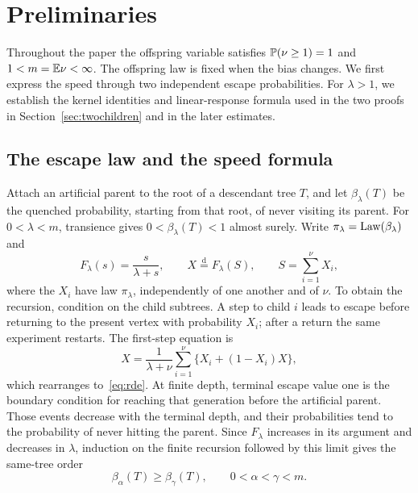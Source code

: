 \section{Preliminaries}\label{sec:preliminaries}

Throughout the paper the offspring variable satisfies $\mathbb P(\nu\ge1)=1$ and $1<m=\mathbb E\nu<\infty$. The offspring law is fixed when the bias changes. We first express the speed through two independent escape probabilities. For $\lambda>1$, we establish the kernel identities and linear-response formula used in the two proofs in Section~\ref{sec:twochildren} and in the later estimates.

\subsection{The escape law and the speed formula}
Attach an artificial parent to the root of a descendant tree $T$, and let $\beta_\lambda(T)$ be the quenched probability, starting from that root, of never visiting its parent. For $0<\lambda<m$, transience gives $0<\beta_\lambda(T)<1$ almost surely. Write $\pi_\lambda=\operatorname{Law}(\beta_\lambda)$ and
\begin{equation}\label{eq:rde}
 F_\lambda(s)=\frac{s}{\lambda+s},\qquad
 X\overset{\mathrm d}=F_\lambda(S),\qquad S=\sum_{i=1}^{\nu}X_i,
\end{equation}
where the $X_i$ have law $\pi_\lambda$, independently of one another and of $\nu$. To obtain the recursion, condition on the child subtrees. A step to child $i$ leads to escape before returning to the present vertex with probability $X_i$; after a return the same experiment restarts. The first-step equation is
\[
 X=\frac1{\lambda+\nu}\sum_{i=1}^{\nu}
 \{X_i+(1-X_i)X\},
\]
which rearranges to~\eqref{eq:rde}. At finite depth, terminal escape value one is the boundary condition for reaching that generation before the artificial parent. Those events decrease with the terminal depth, and their probabilities tend to the probability of never hitting the parent. Since $F_\lambda$ increases in its argument and decreases in $\lambda$, induction on the finite recursion followed by this limit gives the same-tree order
\begin{equation}\label{eq:same-tree}
 \beta_\alpha(T)\ge\beta_\gamma(T),\qquad 0<\alpha<\gamma<m.
\end{equation}

